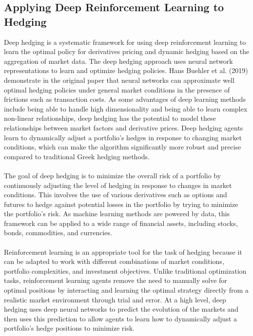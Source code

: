 \subsection{Applying Deep Reinforcement Learning to Hedging}
Deep hedging is a systematic framework for using deep reinforcement learning to learn the optimal policy for derivatives pricing and dynamic hedging based on the aggregation of market data. The deep hedging approach uses neural network representations to learn and optimize hedging policies. Hans Buehler et al. (2019) demonstrate in the original paper that neural networks can approximate well optimal hedging policies under general market conditions in the presence of frictions such as transaction costs. As some advantages of deep learning methods include being able to handle high dimensionality and being able to learn complex non-linear relationships, deep hedging has the potential to model these relationships between market factors and derivative prices. Deep hedging agents learn to dynamically adjust a portfolio's hedges in response to changing market conditions, which can make the algorithm significantly more robust and precise compared to traditional Greek hedging methods.
\\ \\
The goal of deep hedging is to minimize the overall risk of a portfolio by continuously adjusting the level of hedging in response to changes in market conditions. This involves the use of various derivatives such as options and futures to hedge against potential losses in the portfolio by trying to minimize the portfolio's risk. As machine learning methods are powered by data, this framework can be applied to a wide range of financial assets, including stocks, bonds, commodities, and currencies.
\\ \\
Reinforcement learning is an appropriate tool for the task of hedging because it can be adapted to work with different combinations of market conditions, portfolio complexities, and investment objectives. Unlike traditional optimization tasks, reinforcement learning agents remove the need to manually solve for optimal positions by interacting and learning the optimal strategy directly from a realistic market environment through trial and error. At a high level, deep hedging uses deep neural networks to predict the evolution of the markets and then uses this prediction to allow agents to learn how to dynamically adjust a portfolio's hedge positions to minimize risk.
\\ \\
